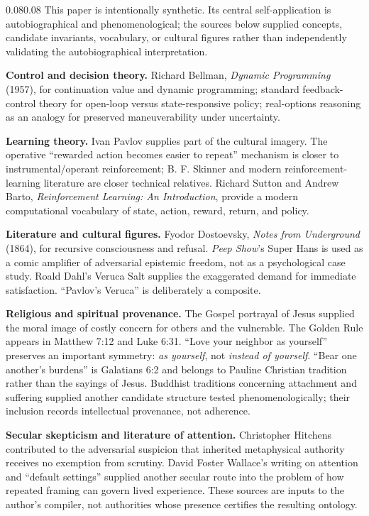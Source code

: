 \documentclass[10pt,letterpaper]{article}
\newenvironment{paperbody}
  {\begin{adjustwidth}{0.08\textwidth}{0.08\textwidth}\justifying}
  {\par\end{adjustwidth}}
\begin{document}
\begin{paperbody}
This paper is intentionally synthetic. Its central self-application is
autobiographical and phenomenological; the sources below supplied
concepts, candidate invariants, vocabulary, or cultural figures rather
than independently validating the autobiographical interpretation.

\textbf{Control and decision theory.} Richard Bellman, \emph{Dynamic
Programming} (1957), for continuation value and dynamic programming;
standard feedback-control theory for open-loop versus state-responsive
policy; real-options reasoning as an analogy for preserved
maneuverability under uncertainty.

\textbf{Learning theory.} Ivan Pavlov supplies part of the cultural
imagery. The operative ``rewarded action becomes easier to repeat''
mechanism is closer to instrumental/operant reinforcement; B. F. Skinner
and modern reinforcement-learning literature are closer technical
relatives. Richard Sutton and Andrew Barto, \emph{Reinforcement
Learning: An Introduction}, provide a modern computational vocabulary of
state, action, reward, return, and policy.

\textbf{Literature and cultural figures.} Fyodor Dostoevsky, \emph{Notes
from Underground} (1864), for recursive consciousness and refusal.
\emph{Peep Show}'s Super Hans is used as a comic amplifier of
adversarial epistemic freedom, not as a psychological case study. Roald
Dahl's Veruca Salt supplies the exaggerated demand for immediate
satisfaction. ``Pavlov's Veruca'' is deliberately a composite.

\textbf{Religious and spiritual provenance.} The Gospel portrayal of
Jesus supplied the moral image of costly concern for others and the
vulnerable. The Golden Rule appears in Matthew 7:12 and Luke 6:31.
``Love your neighbor as yourself'' preserves an important symmetry:
\emph{as yourself}, not \emph{instead of yourself}. ``Bear one another's
burdens'' is Galatians 6:2 and belongs to Pauline Christian tradition
rather than the sayings of Jesus. Buddhist traditions concerning
attachment and suffering supplied another candidate structure tested
phenomenologically; their inclusion records intellectual provenance, not
adherence.

\textbf{Secular skepticism and literature of attention.} Christopher
Hitchens contributed to the adversarial suspicion that inherited
metaphysical authority receives no exemption from scrutiny. David Foster
Wallace's writing on attention and ``default settings'' supplied another
secular route into the problem of how repeated framing can govern lived
experience. These sources are inputs to the author's compiler, not
authorities whose presence certifies the resulting ontology.


\end{paperbody}
\end{document}
